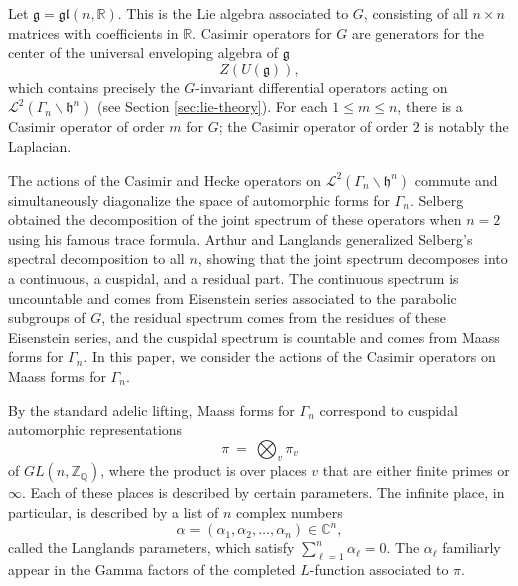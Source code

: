 \documentclass[12pt, reqno, oneside]{amsart}
\numberwithin{equation}{section}
\begin{document}
\sloppy Let $\mathfrak{g} = \mathfrak{gl}(n,\mathbb{R})$. This is the Lie algebra associated to $G$, consisting of all $n \times n$ matrices with coefficients in $\mathbb{R}$. Casimir operators for $G$ are generators for the center of the universal enveloping algebra of $\mathfrak{g}$
\begin{equation*}
Z(U(\mathfrak{g})),
\end{equation*}
which contains precisely the $G$-invariant differential operators acting on $\mathcal{L}^2 \left( \Gamma_n \backslash \mathfrak{h}^n \right)$ (see Section \ref{sec:lie-theory}). For each $1 \leq m \leq n$, there is a Casimir operator of order $m$ for $G$; the Casimir operator of order $2$ is notably the Laplacian. 

The actions of the Casimir and Hecke operators on $\mathcal{L}^2 \left( \Gamma_n \backslash \mathfrak{h}^n \right)$ commute and simultaneously diagonalize the space of automorphic forms for $\Gamma_n$. Selberg \cite{Sel56} obtained the decomposition of the joint spectrum of these operators when $n = 2$ using his famous trace formula. Arthur and Langlands \cite{Art79, Lan76} generalized Selberg's spectral decomposition to all $n$, showing that the joint spectrum decomposes into a continuous, a cuspidal, and a residual part. The continuous spectrum is uncountable and comes from Eisenstein series associated to the parabolic subgroups of $G$, the residual spectrum comes from the residues of these Eisenstein series, and the cuspidal spectrum is countable and comes from Maass forms for $\Gamma_n$. In this paper, we consider the actions of the Casimir operators on Maass forms for $\Gamma_n$. 

By the standard adelic lifting, Maass forms for $\Gamma_n$ correspond to cuspidal automorphic representations
\begin{equation*}
\pi \ = \ \bigotimes_v \pi_v
\end{equation*}
of $GL(n,\mathbb{Z}_\mathbb{Q})$, where the product is over places $v$ that are either finite primes or $\infty$. Each of these places is described by certain parameters. The infinite place, in particular, is described by a list of $n$ complex numbers 
\begin{equation}
\alpha = (\alpha_1, \alpha_2, \dots, \alpha_n) \in \mathbb{C}^n,
\end{equation}
called the Langlands parameters, which satisfy $\sum_{\ell=1}^n \alpha_\ell = 0$. The $\alpha_\ell$ familiarly appear in the Gamma factors of the completed $L$-function associated to $\pi$. 
\end{document}
